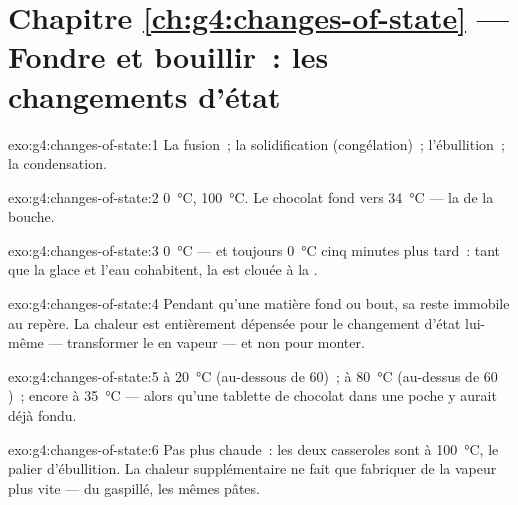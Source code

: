 \section*{Chapitre \ref{ch:g4:changes-of-state} --- Fondre et bouillir~: les changements d'état}

\begin{solution}{exo:g4:changes-of-state:1}
La fusion~; la solidification (congélation)~; l'ébullition~; la
condensation.
\end{solution}

\begin{solution}{exo:g4:changes-of-state:2}
 \qty{0}{\celsius}, 
\qty{100}{\celsius}. Le chocolat fond vers \qty{34}{\celsius} --- la
 de la bouche.
\end{solution}

\begin{solution}{exo:g4:changes-of-state:3}
\qty{0}{\celsius} --- et toujours \qty{0}{\celsius} cinq minutes plus
tard~: tant que la glace et l'eau cohabitent, la  est
clouée à la .
\end{solution}

\begin{solution}{exo:g4:changes-of-state:4}
Pendant qu'une matière fond ou bout, sa  reste immobile au
repère. La chaleur est entièrement dépensée pour le changement d'état
lui-même --- transformer le  en vapeur --- et non pour monter.
\end{solution}

\begin{solution}{exo:g4:changes-of-state:5}
 à \qty{20}{\celsius} (au-dessous de $60$)~;  à
\qty{80}{\celsius} (au-dessus de $60$)~; encore  à
\qty{35}{\celsius} --- alors qu'une tablette de chocolat dans une
poche y aurait déjà fondu.
\end{solution}

\begin{solution}{exo:g4:changes-of-state:6}
Pas plus chaude~: les deux casseroles sont à \qty{100}{\celsius}, le
palier d'ébullition. La chaleur supplémentaire ne fait que fabriquer
de la vapeur plus vite --- du  gaspillé, les mêmes pâtes.
\end{solution}

